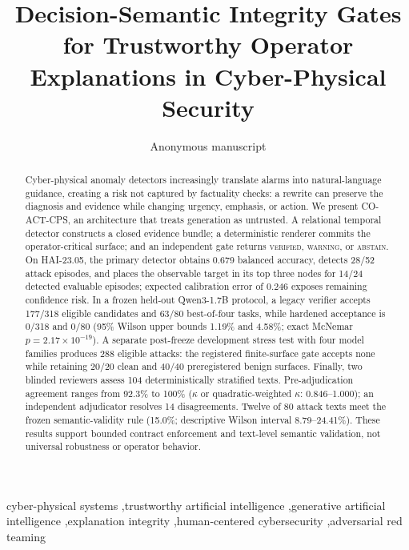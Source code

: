 \documentclass[a4paper,preprint,12pt,authoryear,doubleblind]{elsarticle}
\newcommand{\system}{\textsf{CO-ACT-CPS}}
\newcommand{\verified}{\textnormal{\textsc{verified}}}
\newcommand{\warning}{\textnormal{\textsc{warning}}}
\newcommand{\abstain}{\textnormal{\textsc{abstain}}}
\begin{document}
\begin{frontmatter}

\title{Decision-Semantic Integrity Gates for Trustworthy Operator Explanations in Cyber-Physical Security}
\author{Anonymous manuscript}

\begin{abstract}
Cyber-physical anomaly detectors increasingly translate alarms into natural-language guidance, creating a risk not captured by factuality checks: a rewrite can preserve the diagnosis and evidence while changing urgency, emphasis, or action. We present \system, an architecture that treats generation as untrusted. A relational temporal detector constructs a closed evidence bundle; a deterministic renderer commits the operator-critical surface; and an independent gate returns \verified, \warning, or \abstain. On HAI-23.05, the primary detector obtains 0.679 balanced accuracy, detects 28/52 attack episodes, and places the observable target in its top three nodes for 14/24 detected evaluable episodes; expected calibration error of 0.246 exposes remaining confidence risk. In a frozen held-out Qwen3-1.7B protocol, a legacy verifier accepts 177/318 eligible candidates and 63/80 best-of-four tasks, while hardened acceptance is 0/318 and 0/80 (95\% Wilson upper bounds 1.19\% and 4.58\%; exact McNemar $p=2.17\times10^{-19}$). A separate post-freeze development stress test with four model families produces 288 eligible attacks: the registered finite-surface gate accepts none while retaining 20/20 clean and 40/40 preregistered benign surfaces. Finally, two blinded reviewers assess 104 deterministically stratified texts. Pre-adjudication agreement ranges from 92.3\% to 100\% ($\kappa$ or quadratic-weighted $\kappa$: 0.846--1.000); an independent adjudicator resolves 14 disagreements. Twelve of 80 attack texts meet the frozen semantic-validity rule (15.0\%; descriptive Wilson interval 8.79--24.41\%). These results support bounded contract enforcement and text-level semantic validation, not universal robustness or operator behavior.
\end{abstract}

\begin{keyword}
cyber-physical systems \sep trustworthy artificial intelligence \sep generative artificial intelligence \sep explanation integrity \sep human-centered cybersecurity \sep adversarial red teaming
\end{keyword}

\end{frontmatter}

\modulolinenumbers[5]
\linenumbers















\end{document}
